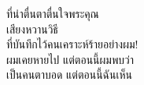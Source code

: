 ที่น่าตื่นตาตื่นใจพระคุณ \\
เสียงหวานวิธี \\
ที่บันทึกไว้คนเคราะห์ร้ายอย่างผม! \\
ผมเคยหายไป แต่ตอนนี้ผมพบว่า  \\
เป็นคนตาบอด แต่ตอนนี้ฉันเห็น \\
